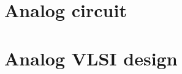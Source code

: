 \documentclass[UTF8]{ctexbook}
\begin{document}
	\part{Analog circuit}
	\label{Analog circuit}
	
	\begin{comment} 
	rather stupid, but helpful 
	\chapter{Transistor circuit analysis}
	\label{Transistor circuit analysis}
	\chapter{Transistor circuit design}
	\label{Transistor circuit design}
	\chapter{FET circuit analysis}
	\label{FET circuit analysis}
	\chapter{FET circuit design}
	\label{FET circuit design}
	\end{comment}
	
	\part{Analog VLSI design}
	\label{Analog VLSI design}
	
	
	\begin{comment} 
	rather stupid, but helpful 
	\chapter{Current source}
	\label{Current source}
	\chapter{Current mirror}
	\label{Current mirror }
	\chapter{Differential amplifier pair}
	\label{Differential amplifier pair}
	\chapter{OP AMP design}
	\label{OP AMP design}
	\end{comment}
\end{document}
